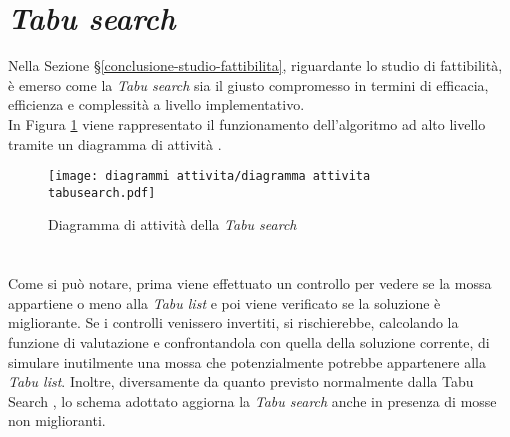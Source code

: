 \section{\textit{Tabu search}}
\label{sec:tabu-search}
\noindent Nella Sezione §\ref{conclusione-studio-fattibilita},
riguardante lo studio di fattibilità, è emerso come la \textit{Tabu search}
sia il giusto compromesso in termini di efficacia, efficienza
e complessità a livello implementativo.\\
In Figura \ref{diagramma-attivita-tabu-search}
viene rappresentato il funzionamento dell'algoritmo ad alto livello tramite un diagramma di attività \cite{siteH:rcardin}.
\vspace*{\fill}
\begin{figure}[!h] 
    \centering 
    \texttt{[image: diagrammi attivita/diagramma attivita tabusearch.pdf]} 
    \caption{Diagramma di attività della \textit{Tabu search}}
    \label{diagramma-attivita-tabu-search}
\end{figure}
\noindent \paragraph{}\hfill\\
Come si può notare, prima viene effettuato un controllo per vedere se la mossa
appartiene o meno alla \textit{Tabu list} e poi viene verificato se la soluzione è migliorante.
Se i controlli venissero invertiti, si rischierebbe, calcolando
la funzione di valutazione e confrontandola con quella della soluzione corrente,
di simulare inutilmente una mossa che potenzialmente potrebbe appartenere alla \textit{Tabu list}.
Inoltre, diversamente da quanto previsto normalmente dalla Tabu Search \cite{siteS:dispense-de-giovanni},
lo schema adottato aggiorna la \textit{Tabu search} anche in presenza di mosse non miglioranti.
\vspace*{\fill}

\newpage

